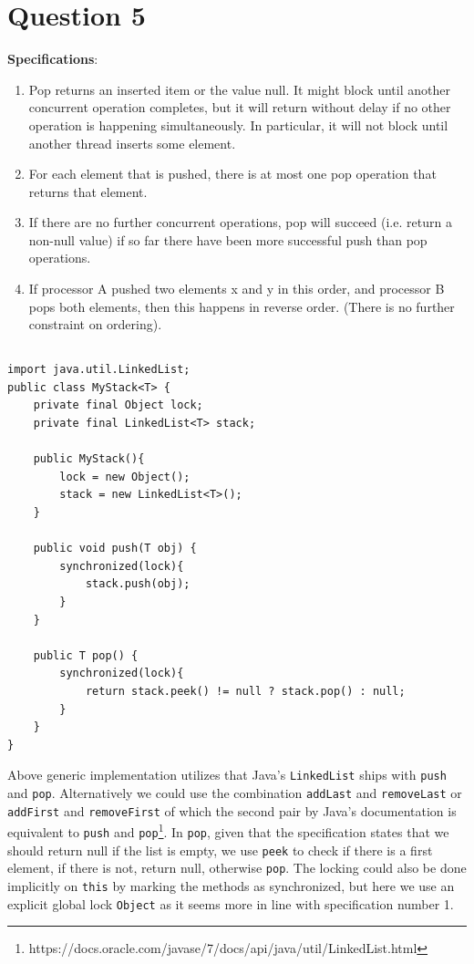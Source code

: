 \documentclass[a5paper]{article}
\begin{document}
\section{Question 5}
\textbf{Specifications}:
\begin{enumerate}
\item Pop returns an inserted item or the value null. It might block until another concurrent operation completes, but it will return without delay if no other operation is happening simultaneously. In particular, it will not block until another thread inserts some element.
\item For each element that is pushed, there is at most one pop operation that returns that element.
\item If there are no further concurrent operations, pop will succeed (i.e. return a non-null value) if so far there
have been more successful push than pop operations.
\item If processor A pushed two elements x and y in this order, and processor B pops both elements, then this
happens in reverse order. (There is no further constraint on ordering).
\end{enumerate}

\subsection{}\label{sec:mystacksimple}
\begin{lstlisting}
import java.util.LinkedList;
public class MyStack<T> {
    private final Object lock;
    private final LinkedList<T> stack;

    public MyStack(){
        lock = new Object();
        stack = new LinkedList<T>();
    }

    public void push(T obj) {
        synchronized(lock){
            stack.push(obj);
        }
    }

    public T pop() {
        synchronized(lock){
            return stack.peek() != null ? stack.pop() : null;
        }
    }
}
\end{lstlisting}

Above generic implementation utilizes that Java's \texttt{LinkedList} ships with \texttt{push} and \texttt{pop}.
Alternatively we could use the combination \texttt{addLast} and \texttt{removeLast} or \texttt{addFirst} and \texttt{removeFirst} of which the second pair by Java's documentation is equivalent to \texttt{push} and \texttt{pop}\footnote{https://docs.oracle.com/javase/7/docs/api/java/util/LinkedList.html}. 
In \texttt{pop}, given that the specification states that we should return null if the list is empty, we use \texttt{peek} to check if there is a first element, if there is not, return null, otherwise \texttt{pop}.
The locking could also be done implicitly on \texttt{this} by marking the methods as synchronized, but here we use an explicit global lock \texttt{Object} as it seems more in line with specification number 1.
\end{document}
